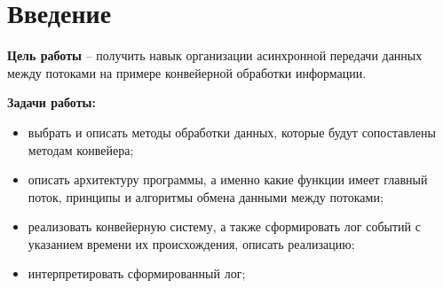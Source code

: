 \chapter*{Введение}
\textbf{Цель работы} – получить навык организации асинхронной передачи данных между потоками на примере конвейерной обработки информации.

\textbf{Задачи работы:}
\begin{itemize}
	\item выбрать и описать методы обработки данных, которые будут сопоставлены методам конвейера;
	\item описать архитектуру программы, а именно какие функции имеет главный поток, принципы и алгоритмы обмена данными между потоками;
	\item реализовать конвейерную систему, а также сформировать лог событий с указанием времени их происхождения, описать реализацию;
	\item интерпретировать сформированный лог;
\end{itemize}